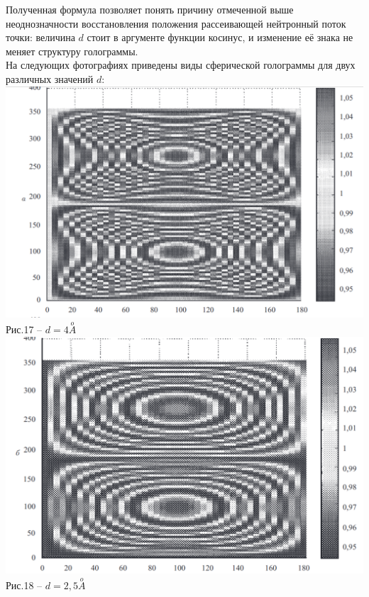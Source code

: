 \documentclass[11pt]{report}
\begin{document}
Полученная формула позволяет понять причину отмеченной выше неоднозначности восстановления положения рассеивающей нейтронный поток точки: величина $d$ стоит в аргументе функции косинус, и изменение её знака не меняет структуру голограммы. \\

На следующих фотографиях приведены виды сферической голограммы для двух различных значений $d$: \\

\includegraphics[scale=0.4]{ng_2}\\
Рис.17 -- $d=4\stackrel{o}A$\\

\includegraphics[scale=0.4]{ng_3}\\
Рис.18 -- $d=2,5\stackrel{o}A$\\
\end{document}
